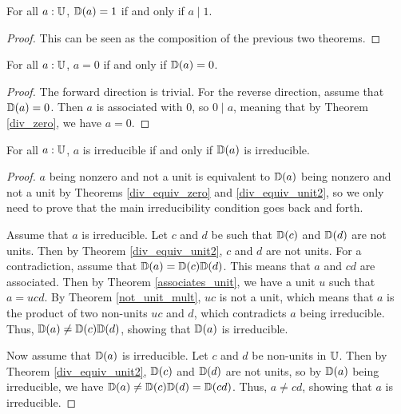 \documentclass[../../math.tex]{subfiles}
\begin{document}
\begin{theorem} \label{div_equiv_one}
    For all $a : \mathbb{U}$, $\mathbb{D}(a) = 1$ if and only if $a \mid 1$.
\end{theorem}
\begin{proof}
    This can be seen as the composition of the previous two theorems.
\end{proof}

\begin{theorem} \label{div_equiv_zero}
    For all $a : \mathbb{U}$, $a = 0$ if and only if $\mathbb{D}(a) = 0$.
\end{theorem}
\begin{proof}
    The forward direction is trivial.  For the reverse direction, assume that
    $\mathbb{D}(a) = 0$.  Then $a$ is associated with $0$, so $0 \mid a$, meaning that
    by Theorem \ref{div_zero}, we have $a = 0$.
\end{proof}

\begin{theorem} \label{div_equiv_irreducible}
    For all $a : \mathbb{U}$, $a$ is irreducible if and only if $\mathbb{D}(a)$ is irreducible.
\end{theorem}
\begin{proof}
    $a$ being nonzero and not a unit is equivalent to $\mathbb{D}(a)$ being nonzero and
    not a unit by Theorems \ref{div_equiv_zero} and \ref{div_equiv_unit2}, so we
    only need to prove that the main irreducibility condition goes back and
    forth.

    Assume that $a$ is irreducible.  Let $c$ and $d$ be such that $\mathbb{D}(c)$ and
    $\mathbb{D}(d)$ are not units.  Then by Theorem \ref{div_equiv_unit2}, $c$ and $d$
    are not units.  For a contradiction, assume that $\mathbb{D}(a) = \mathbb{D}(c) \mathbb{D}(d)$.
    This means that $a$ and $cd$ are associated.  Then by Theorem
    \ref{associates_unit}, we have a unit $u$ such that $a = ucd$.  By Theorem
    \ref{not_unit_mult}, $uc$ is not a unit, which means that $a$ is the product
    of two non-units $uc$ and $d$, which contradicts $a$ being irreducible.
    Thus, $\mathbb{D}(a) \neq \mathbb{D}(c) \mathbb{D}(d)$, showing that $\mathbb{D}(a)$ is irreducible.

    Now assume that $\mathbb{D}(a)$ is irreducible.  Let $c$ and $d$ be non-units in
    $\mathbb{U}$.  Then by Theorem \ref{div_equiv_unit2}, $\mathbb{D}(c)$ and $\mathbb{D}(d)$ are not
    units, so by $\mathbb{D}(a)$ being irreducible, we have $\mathbb{D}(a) \neq \mathbb{D}(c) \mathbb{D}(d) =
    \mathbb{D}(cd)$.  Thus, $a \neq cd$, showing that $a$ is irreducible.
\end{proof}
\end{document}
